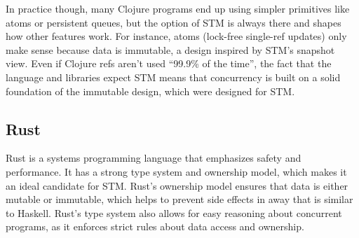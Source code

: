 In practice though, many Clojure programs end up using simpler primitives like atoms or persistent queues, but the option of STM is always there and shapes how other features work. For instance, atoms (lock-free single-ref updates) only make sense because data is immutable, a design inspired by STM’s snapshot view. Even if Clojure refs aren’t used “99.9\% of the time”, the fact that the language and libraries expect STM means that concurrency is built on a solid foundation of the immutable design, which were designed for STM\cite{news.ycombinator.com}.

\subsection{Rust}
Rust is a systems programming language that emphasizes safety and performance. It has a strong type system and ownership model, which makes it an ideal candidate for STM. Rust's ownership model ensures that data is either mutable or immutable, which helps to prevent side effects in away that is similar to Haskell. Rust's type system also allows for easy reasoning about concurrent programs, as it enforces strict rules about data access and ownership\cite{rustWiki}.
